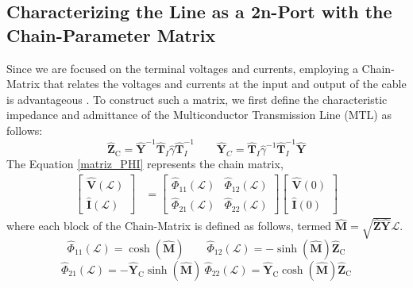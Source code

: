 \documentclass[journal,transmag]{IEEEtran}
\begin{document}
\subsection{Characterizing the Line as a 2n-Port with the Chain-Parameter Matrix}

Since we are focused on the terminal voltages and currents, employing a Chain-Matrix that relates the voltages and currents at the input and output of the cable is advantageous \cite{Paul2007}. To construct such a matrix, we first define the characteristic impedance and admittance of the Multiconductor Transmission Line (MTL) as follows:
\begin{equation}
\hat{\mathbf{Z}}_{\mathrm{C}}=\hat{\mathbf{Y}}^{-1} \hat{\mathbf{T}}_I \hat{\gamma} \hat{\mathbf{T}}_I^{-1} \qquad \hat{\mathbf{Y}}_C = \hat{\mathbf{T}}_I \hat{\gamma}^{-1} \hat{\mathbf{T}}_I^{-1} \hat{\mathbf{Y}}
\end{equation}
The Equation \ref{matriz_PHI} represents the chain matrix,
\begin{equation}
\begin{aligned}
{\left[\begin{array}{l}
\hat{\mathbf{V}}(\mathscr{L}) \\
\hat{\mathbf{I}}(\mathscr{L})
\end{array}\right] } & =\left[\begin{array}{ll}
\hat{\Phi}_{11}(\mathscr{L}) & \hat{\Phi}_{12}(\mathscr{L}) \\
\hat{\Phi}_{21}(\mathscr{L}) & \hat{\Phi}_{22}(\mathscr{L})
\end{array}\right]\left[\begin{array}{l}
\hat{\mathbf{V}}(0) \\
\hat{\mathbf{I}}(0)
\end{array}\right]
\end{aligned}
\label{matriz_PHI}
\end{equation}
where each block of the Chain-Matrix is defined as follows, termed  $\hat{\mathbf{M}} = \sqrt{\hat{\mathbf{Z}} \hat{\mathbf{Y}}} \mathscr{L}$.
\begin{equation*}
\hat{\Phi}_{11}(\mathscr{L})  =\cosh \left( \hat{\mathbf{M}} \right) \qquad \hat{\Phi}_{12}(\mathscr{L}) =-\sinh \left( \hat{\mathbf{M}} \right) \hat{\mathbf{Z}}_{\mathrm{C}}
\end{equation*}
\begin{equation*}
\hat{\Phi}_{21}(\mathscr{L}) =-\hat{\mathbf{Y}}_{\mathrm{C}} \sinh \left( \hat{\mathbf{M}} \right)  ~ \hat{\Phi}_{22}(\mathscr{L}) = \hat{\mathbf{Y}}_{\mathrm{C}} \cosh \left( \hat{\mathbf{M}} \right) \hat{\mathbf{Z}}_{\mathrm{C}}
\end{equation*}
\end{document}
